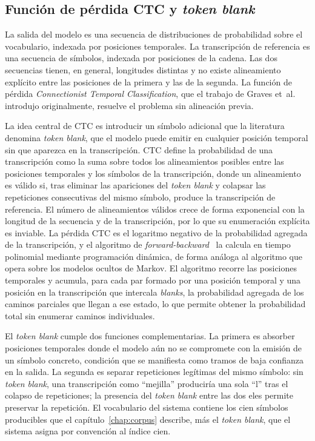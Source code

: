 \subsection{Función de pérdida CTC y \textit{token blank}}
\label{subsec:ctc-loss}

La salida del modelo es una secuencia de distribuciones de probabilidad sobre el vocabulario, indexada por posiciones temporales. La transcripción de referencia es una secuencia de símbolos, indexada por posiciones de la cadena. Las dos secuencias tienen, en general, longitudes distintas y no existe alineamiento explícito entre las posiciones de la primera y las de la segunda. La función de pérdida \textit{Connectionist Temporal Classification}, que el trabajo de Graves et~al.~\cite{graves2006ctc} introdujo originalmente, resuelve el problema sin alineación previa.

La idea central de CTC es introducir un símbolo adicional que la literatura denomina \textit{token blank}, que el modelo puede emitir en cualquier posición temporal sin que aparezca en la transcripción. CTC define la probabilidad de una transcripción como la suma sobre todos los alineamientos posibles entre las posiciones temporales y los símbolos de la transcripción, donde un alineamiento es válido si, tras eliminar las apariciones del \textit{token blank} y colapsar las repeticiones consecutivas del mismo símbolo, produce la transcripción de referencia. El número de alineamientos válidos crece de forma exponencial con la longitud de la secuencia y de la transcripción, por lo que su enumeración explícita es inviable. La pérdida CTC es el logaritmo negativo de la probabilidad agregada de la transcripción, y el algoritmo de \textit{forward-backward}~\cite{graves2006ctc} la calcula en tiempo polinomial mediante programación dinámica, de forma análoga al algoritmo que opera sobre los modelos ocultos de Markov. El algoritmo recorre las posiciones temporales y acumula, para cada par formado por una posición temporal y una posición en la transcripción que intercala \textit{blanks}, la probabilidad agregada de los caminos parciales que llegan a ese estado, lo que permite obtener la probabilidad total sin enumerar caminos individuales.

El \textit{token blank} cumple dos funciones complementarias. La primera es absorber posiciones temporales donde el modelo aún no se compromete con la emisión de un símbolo concreto, condición que se manifiesta como tramos de baja confianza en la salida. La segunda es separar repeticiones legítimas del mismo símbolo: sin \textit{token blank}, una transcripción como ``mejilla'' produciría una sola ``l'' tras el colapso de repeticiones; la presencia del \textit{token blank} entre las dos eles permite preservar la repetición. El vocabulario del sistema contiene los cien símbolos producibles que el capítulo~\ref{chap:corpus} describe, más el \textit{token blank}, que el sistema asigna por convención al índice cien.

